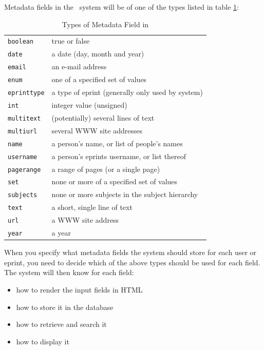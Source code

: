 Metadata fields in the \eprints\ system will be of one of the types listed in table \ref{table_metadata_types}:

\begin{table}
\begin{tabular}{|l|l|}
\hline
{\tt boolean}    & true or false \\
{\tt date}       & a date (day, month and year) \\
{\tt email}      & an e-mail address \\
{\tt enum}       & one of a specified set of values \\
{\tt eprinttype} & a type of eprint (generally only used by system) \\
{\tt int}        & integer value (unsigned) \\
{\tt multitext}  & (potentially) several lines of text \\
{\tt multiurl}   & several WWW site addresses \\
{\tt name}       & a person's name, or list of people's names \\
{\tt username}   & a person's eprints username, or list thereof \\
{\tt pagerange}  & a range of pages (or a single page) \\
{\tt set}        & none or more of a specified set of values \\
{\tt subjects}   & none or more subjects in the subject hierarchy \\
{\tt text}       & a short, single line of text \\
{\tt url}        & a WWW site address \\
{\tt year}       & a year \\
\hline
\end{tabular}
\caption{\label{table_metadata_types} Types of Metadata Field in \eprints}
\end{table}

When you specify what metadata fields the system should store for each user or eprint, you need to decide which of the above types should be used for each field. The system will then know for each field:

\begin{itemize}
\item how to render the input fields in HTML
\item how to store it in the database
\item how to retrieve and search it
\item how to display it
\end{itemize}

